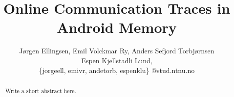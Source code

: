 \documentclass{sig-alternate-05-2015}
\begin{document}
\title{Online Communication Traces in Android Memory}

\author{
J{\o}rgen Ellingsen, Emil Volckmar Ry, Anders Sefjord Torbj{\o}rnsen\\
Espen Kjellstadli Lund,\\
\{jorgeell, emivr, andetorb, espenklu\} @stud.ntnu.no
}

\maketitle
\begin{abstract}
Write a short abstract here.
\end{abstract}
















  
\end{document}
